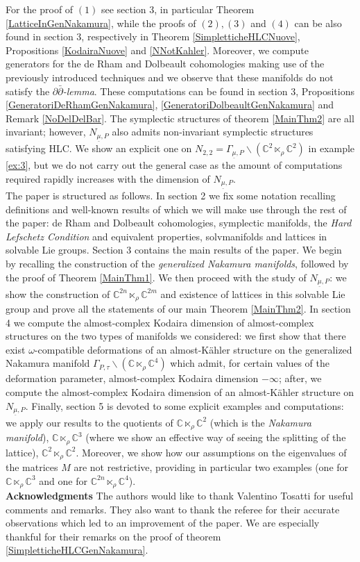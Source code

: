 \documentclass[a4paper, 11pt]{amsart}
\theoremstyle{plain}
\theoremstyle{definition}
\newcommand{\del}{\partial}
\newcommand{\delbar}{\bar{\partial}}
\newcommand{\C}{\mathbb{C}}
\numberwithin{equation}{section}
\begin{document}
{For the proof of $(1)$ see section 3, in particular Theorem \ref{LatticeInGenNakamura}, while the proofs of $(2), (3)$ and $(4)$ can be also found in section 3, respectively in Theorem \ref{SimpletticheHLCNuove}, Propositions \ref{KodairaNuove} and \ref{NNotKahler}. Moreover, we compute generators for the de Rham and Dolbeault cohomologies making use of the previously introduced techniques and we observe that these manifolds do not satisfy the \textit{$\del\delbar$-lemma}. These computations can be found in section 3, Propositions \ref{GeneratoriDeRhamGenNakamura}, \ref{GeneratoriDolbeaultGenNakamura} and Remark \ref{NoDelDelBar}. The symplectic structures of theorem \ref{MainThm2} are all invariant; however, $N_{\underline{\mu},P}$ also admits non-invariant symplectic structures satisfying HLC. We show an explicit one on $N_{2,2} =\Gamma_{\underline{\mu},P} \backslash (\C^{2} \ltimes_{\rho} \C^{2}) $ in example \ref{ex:3}, but we do not carry out the general case as the amount of computations required rapidly increases with the dimension of $N_{\underline{\mu},P}$.\\[5pt]
The paper is structured as follows. In section 2 we fix some notation recalling definitions and well-known results of which we will make use through the rest of the paper: de Rham and Dolbeault cohomologies, symplectic manifolds, the \textit{Hard Lefschetz Condition} and equivalent properties, solvmanifolds and lattices in solvable Lie groups. Section 3 contains the main results of the paper. We begin by recalling the construction of the \textit{generalized Nakamura manifolds}, followed by the proof of Theorem \ref{MainThm1}. We then proceed with the study of $N_{\underline{\mu},P}$: we show the construction of $\C^{2n} \ltimes_{\rho} \C^{2m}$ and existence of lattices in this solvable Lie group and prove all the statements of our main Theorem \ref{MainThm2}. In section 4 we compute the almost-complex Kodaira dimension of almost-complex structures on the two types of manifolds we considered: we first show that there exist $\omega$-compatible deformations of an almost-K\"ahler structure on the generalized Nakamura manifold $\Gamma_{P,\tau} \backslash (\C \ltimes_{\rho} \C^{4})$ which admit, for certain values of the deformation parameter, almost-complex Kodaira dimension $-\infty$; after, we compute the almost-complex Kodaira dimension of an almost-K\"ahler structure on $N_{\underline{\mu},P}$. Finally, section 5 is devoted to some explicit examples and computations: we apply our results to the quotients of $\C \ltimes_{\rho} \C^{2}$ (which is the \textit{Nakamura manifold}), $\C \ltimes_{\rho} \C^{3}$ (where we show an effective way of seeing the splitting of the lattice), $\C^{2} \ltimes_{\rho} \C^{2}$. Moreover, we show how our assumptions on the eigenvalues of the matrices $M$ are not restrictive, providing in particular two examples (one for $\C \ltimes_{\rho} \C^{3}$ and one for $\C^{2n} \ltimes_{\rho} \C^{4}$).\\[10pt]
\textbf{Acknowledgments} The authors would like to thank Valentino Tosatti for useful comments and remarks. They also want to thank the referee for their accurate observations which led to an improvement of the paper. We are especially thankful for their remarks on the proof of theorem \ref{SimpletticheHLCGenNakamura}.

}
\end{document}
